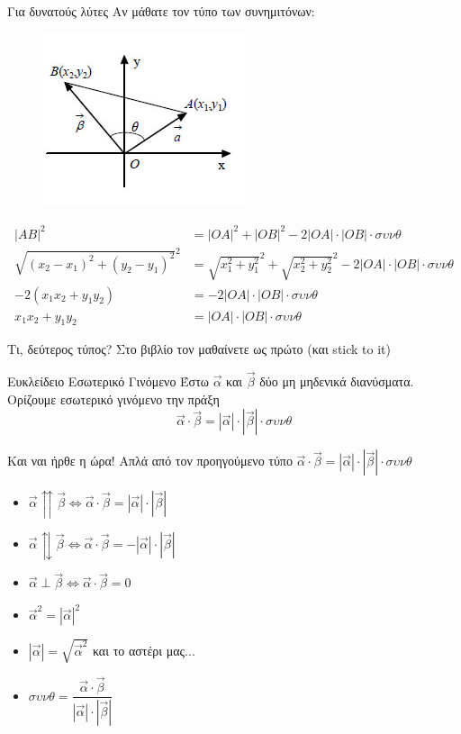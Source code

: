 \documentclass{../../presentation}
\begin{document}
\begin{frame}{Για δυνατούς λύτες}
  Αν μάθατε τον τύπο των συνημιτόνων:
  \begin{figure}
    \centering
    \includegraphics[width=0.35 \textwidth]{"../images/dotproductproof"}
  \end{figure}
  \begin{align*}
    |AB|^2                           & =|OA|^2+|OB|^2-2|OA|\cdot|ΟΒ|\cdot συνθ                             \\
    \sqrt{(x_2-x_1)^2+(y_2-y_1)^2}^2 & =\sqrt{x_1^2+y_1^2}^2+\sqrt{x_2^2+y_2^2}^2-2|OA|\cdot|ΟΒ|\cdot συνθ \\
    -2(x_1x_2+y_1y_2)                & =-2|OA|\cdot|ΟΒ|\cdot συνθ                                          \\
    x_1x_2+y_1y_2                    & =|OA|\cdot|ΟΒ|\cdot συνθ
  \end{align*}
\end{frame}

\begin{frame}{Τι, δεύτερος τύπος?}
  Στο βιβλίο τον μαθαίνετε ως πρώτο (και stick to it)
  \begin{block}{Ευκλείδειο Εσωτερικό Γινόμενο}
    Έστω $\vec{α}$ και $\vec{β}$ δύο μη μηδενικά διανύσματα. Ορίζουμε εσωτερικό γινόμενο την πράξη
    $$\vec{α}\cdot\vec{β} = |\vec{α}|\cdot|\vec{β}|\cdot συνθ$$
  \end{block}

\end{frame}

\begin{frame}{Και ναι ήρθε η ώρα!}
  Απλά από τον προηγούμενο τύπο $\vec{α}\cdot\vec{β} = |\vec{α}|\cdot|\vec{β}|\cdot συνθ$
  \begin{itemize}
    \item<1-> $\vec{α}\upuparrows\vec{β}\iff \vec{α}\cdot\vec{β} = |\vec{α}|\cdot|\vec{β}|$
    \item<2-> $\vec{α}\updownarrows\vec{β}\iff \vec{α}\cdot\vec{β} = -|\vec{α}|\cdot|\vec{β}|$
    \item<3-> $\vec{α}\perp\vec{β}\iff \vec{α}\cdot\vec{β} = 0$
    \item<4-> $\vec{α}^2=|\vec{α}|^2$
    \item<5-> $|\vec{α}|=\sqrt{\vec{α}^2}$
           {και το αστέρι μας...}
    \item<7-> $συνθ=\dfrac{\vec{α}\cdot\vec{β}}{|\vec{α}|\cdot|\vec{β}|}$
  \end{itemize}
\end{frame}
\end{document}
